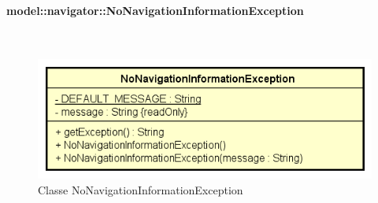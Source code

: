 \documentclass[../DefinizioneDiProdotto.tex]{subfiles}
\begin{document}
\paragraph{model::navigator::NoNavigationInformationException}
\
\begin{figure}[H]
	\centering
	\includegraphics[width=\maxwidth]{img/NoNavigationInformationException.png}
	\caption{Classe NoNavigationInformationException}\label{fig:model::navigator::NoNavigationInformationException} 
\end{figure}
\end{document}
